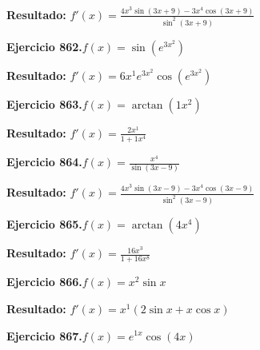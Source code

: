 \documentclass[10pt,a4paper]{article}
\begin{document}
\begin{solbox}
\textbf{Resultado:} \(\displaystyle f'(x) = \frac{4x^{3}\sin(3x +9) - 3x^{4}\cos(3x +9)}{\sin^2(3x +9)}\)
\end{solbox}

\newpage
\begin{ejbox}
\textbf{Ejercicio 862.}\quad $f(x) = \sin(e^{3x^{2}})$
\end{ejbox}

\begin{solbox}
\textbf{Resultado:} \(\displaystyle f'(x) = 6x^{1}e^{3x^{2}}\cos(e^{3x^{2}})\)
\end{solbox}

\begin{ejbox}
\textbf{Ejercicio 863.}\quad $f(x) = \arctan(1x^{2})$
\end{ejbox}

\begin{solbox}
\textbf{Resultado:} \(\displaystyle f'(x) = \frac{2x^{1}}{1+1x^{4}}\)
\end{solbox}

\begin{ejbox}
\textbf{Ejercicio 864.}\quad $f(x) = \frac{x^{4}}{\sin(3x -9)}$
\end{ejbox}

\begin{solbox}
\textbf{Resultado:} \(\displaystyle f'(x) = \frac{4x^{3}\sin(3x -9) - 3x^{4}\cos(3x -9)}{\sin^2(3x -9)}\)
\end{solbox}

\newpage
\begin{ejbox}
\textbf{Ejercicio 865.}\quad $f(x) = \arctan(4x^{4})$
\end{ejbox}

\begin{solbox}
\textbf{Resultado:} \(\displaystyle f'(x) = \frac{16x^{3}}{1+16x^{8}}\)
\end{solbox}

\begin{ejbox}
\textbf{Ejercicio 866.}\quad $f(x) = x^{2} \sin x$
\end{ejbox}

\begin{solbox}
\textbf{Resultado:} \(\displaystyle f'(x) = x^{1}(2\sin x + x\cos x)\)
\end{solbox}

\begin{ejbox}
\textbf{Ejercicio 867.}\quad $f(x) = e^{1x} \cos(4x)$
\end{ejbox}
\end{document}

